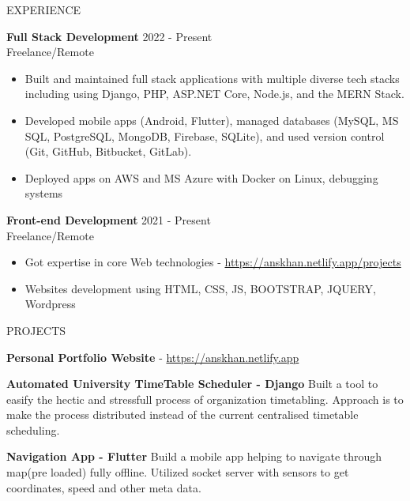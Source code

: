 \documentclass{resume} %
\begin{document}
\begin{rSection}{EXPERIENCE}

\textbf{Full Stack Development} \hfill 2022 - Present\\
Freelance/Remote %
 \begin{itemize}
    \itemsep -3pt {} 
     \item Built and maintained full stack applications with multiple diverse tech stacks including using Django, PHP, ASP.NET Core, Node.js, and the MERN Stack.
     \item Developed mobile apps (Android, Flutter), managed databases (MySQL, MS SQL, PostgreSQL, MongoDB, Firebase, SQLite), and used version control (Git, GitHub, Bitbucket, GitLab).
     \item Deployed apps on AWS and MS Azure with Docker on Linux, debugging systems 
 \end{itemize}


\textbf{Front-end Development} \hfill 2021  - Present\\
Freelance/Remote  \hfill %
 \begin{itemize}
    \itemsep -3pt {} 
     \item Got expertise in core Web technologies - \href{https://anskhan.netlify.app/projects}{https://anskhan.netlify.app/projects}
     \item Websites development using HTML, CSS, JS, BOOTSTRAP, JQUERY, Wordpress
   
 \end{itemize}
 

\end{rSection} 


\begin{rSection}{PROJECTS}
\vspace{-1.25em}
\item \textbf{Personal Portfolio Website}  - \href{https://anskhan.netlify.app}{https://anskhan.netlify.app}
\item \textbf{Automated University TimeTable Scheduler - Django} {Built a tool to easify the hectic and stressfull process of organization timetabling. Approach is to make the process distributed instead of the current centralised timetable scheduling.}
\item \textbf{Navigation App - Flutter} {Build a mobile app helping to navigate through map(pre loaded) fully offline. Utilized socket server with sensors to get coordinates, speed and other meta data.}

\end{rSection} 
\end{document}
